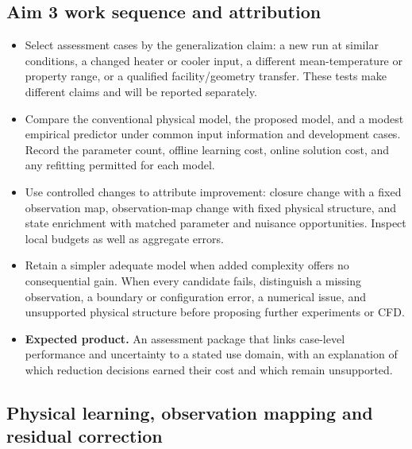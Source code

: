 \subsection{Aim 3 work sequence and attribution}\label{subsec:aim-three-work-sequence}
\begin{itemize}[leftmargin=*]
\item Select assessment cases by the generalization claim: a new run at similar conditions, a changed heater or cooler input, a different mean-temperature or property range, or a qualified facility/geometry transfer. These tests make different claims and will be reported separately.
\item Compare the conventional physical model, the proposed model, and a modest empirical predictor under common input information and development cases. Record the parameter count, offline learning cost, online solution cost, and any refitting permitted for each model.
\item Use controlled changes to attribute improvement: closure change with a fixed observation map, observation-map change with fixed physical structure, and state enrichment with matched parameter and nuisance opportunities. Inspect local budgets as well as aggregate errors.
\item Retain a simpler adequate model when added complexity offers no consequential gain. When every candidate fails, distinguish a missing observation, a boundary or configuration error, a numerical issue, and unsupported physical structure before proposing further experiments or CFD.
\item \textbf{Expected product.} An assessment package that links case-level performance and uncertainty to a stated use domain, with an explanation of which reduction decisions earned their cost and which remain unsupported.\cite{oliver2014unobserved}
\end{itemize}

\subsection{Physical learning, observation mapping and residual correction}\label{subsec:physical-learning-observation-mapping-and-residual-correction}

